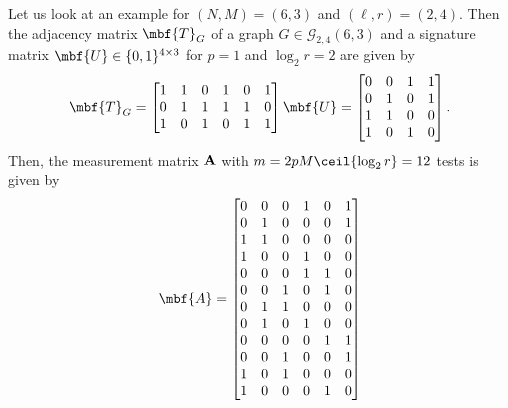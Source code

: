 \documentclass[conference,twocolumn]{IEEEtran}
\begin{document}
\begin{Example}\label{exmp:tensor}
Let us look at an example for $(N,M)=(6,3)$ and $(\ell,r)=(2,4)$. Then the adjacency matrix $\mbf{T}_G$ of a graph $G\in\mathcal{G}_{2,4}(6,3)$ and a signature matrix $\mbf{U}\in \{0,1\}^{4\times 3}$ for $p=1$ and $\log_2 r = 2$ are given by
 \[
 \mbf{T}_G = \begin{bmatrix}
1 & 1 & 0 & 1 & 0 & 1    \\
0 & 1 & 1 & 1& 1 & 0 \\
1 & 0 & 1 & 0 & 1 & 1
\end{bmatrix}
\mbf{U} = \begin{bmatrix}
0 & 0 & 1  & 1\\
0 & 1 & 0  & 1\\
1 & 1 & 0  & 0\\
1 & 0 & 1  & 0
\end{bmatrix}.
 \] 
Then, the measurement matrix $\bf A	$ with $m = 2pM\ceil{\log_2 r}=12$ tests is given by
\[ \mbf{A} = \begin{bmatrix}
0 & 0 & 0 & 1 & 0 & 1\\
0 & 1 & 0 & 0 & 0 & 1\\
1 & 1 & 0 & 0 & 0 & 0\\
1 & 0 & 0 & 1 & 0 & 0\\
0 & 0 & 0 & 1& 1 & 0 \\
0 & 0 & 1 & 0& 1 & 0 \\
0 & 1 & 1 & 0& 0 & 0 \\
0 & 1 & 0 & 1& 0 & 0 \\
0 & 0 & 0 & 0 & 1 & 1\\
0 & 0 & 1 & 0 & 0 & 1\\
1 & 0 & 1 & 0 & 0 & 0\\
1 & 0 & 0 & 0 & 1 & 0\\
\end{bmatrix}
 \]
 \end{Example}
\end{document}

